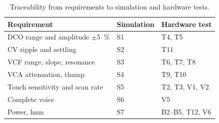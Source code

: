 \documentclass[11pt,a4paper]{article}
\begin{document}
\begin{table}[h]
\centering\small
\caption{Traceability from requirements to simulation and hardware tests.}\label{tab:trace}
\begin{tabular}{@{}l l l@{}}
\toprule
Requirement & Simulation & Hardware test \\
\midrule
DCO range and amplitude $\pm$\SI{5}{\percent} & S1 & T4, T5 \\
CV ripple and settling & S2 & T11 \\
VCF range, slope, resonance & S3 & T6, T7, T8 \\
VCA attenuation, thump & S4 & T9, T10 \\
Touch sensitivity and scan rate & S5 & T2, T3, V1, V2 \\
Complete voice & S6 & V5 \\
Power, hum & S7 & B2--B5, T12, V6 \\
\bottomrule
\end{tabular}
\end{table}

\end{document}
